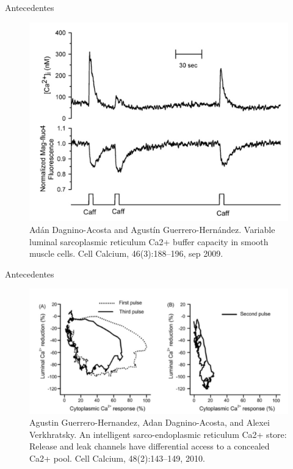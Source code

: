 \begin{frame}{Antecedentes}

\begin{figure}[h]
	\includegraphics{FIGURA1}
	\caption{{\tiny Adán Dagnino-Acosta and Agustín Guerrero-Hernández. Variable luminal sarcoplasmic
		reticulum Ca2+ buffer capacity in smooth muscle cells. Cell Calcium, 46(3):188–196, sep 2009.}}
\end{figure}

\end{frame}

\begin{frame}{Antecedentes}
	
	\begin{figure}[h]
		\includegraphics[width=\textwidth]{FIGURA3}
		\caption{{\tiny Agustin Guerrero-Hernandez, Adan Dagnino-Acosta, and Alexei Verkhratsky. An intelligent sarco-endoplasmic reticulum Ca2+ store: Release and leak channels have differential access to a concealed Ca2+ pool. Cell Calcium, 48(2):143–149, 2010.}}
	\end{figure}
	
\end{frame}

